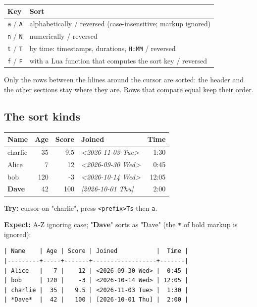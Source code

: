 \begin{center}
\begin{tabular}{ll}
Key & Sort\\
\hline
\texttt{a} / \texttt{A} & alphabetically / reversed (case-insensitive; markup ignored)\\
\texttt{n} / \texttt{N} & numerically / reversed\\
\texttt{t} / \texttt{T} & by time: timestamps, durations, \texttt{H:MM} / reversed\\
\texttt{f} / \texttt{F} & with a Lua function that computes the sort key / reversed\\
\end{tabular}
\end{center}

Only the rows between the hlines around the cursor are sorted: the header
and the other sections stay where they are. Rows that compare equal keep
their order.
\subsection{The sort kinds}
\label{sec:org538b2c8}
\begin{table}[htbp]
\label{tab:org6f725ab}
\centering
\begin{tabular}{lrrlr}
Name & Age & Score & Joined & Time\\
\hline
charlie & 35 & 9.5 & \textit{<2026-11-03 Tue>} & 1:30\\
Alice & 7 & 12 & \textit{<2026-09-30 Wed>} & 0:45\\
bob & 120 & -3 & \textit{<2026-10-14 Wed>} & 12:05\\
\textbf{Dave} & 42 & 100 & \textit{{[}2026-10-01 Thu]} & 2:00\\
\end{tabular}
\end{table}

\textbf{Try:} cursor on "charlie", press \texttt{<prefix>Ts} then \texttt{a}.

\textbf{Expect:} A-Z ignoring case; "\textbf{Dave}" sorts as "Dave" (the \texttt{*} of bold
markup is ignored):
\begin{verbatim}
| Name    | Age | Score | Joined           |  Time |
|---------+-----+-------+------------------+-------|
| Alice   |   7 |    12 | <2026-09-30 Wed> |  0:45 |
| bob     | 120 |    -3 | <2026-10-14 Wed> | 12:05 |
| charlie |  35 |   9.5 | <2026-11-03 Tue> |  1:30 |
| *Dave*  |  42 |   100 | [2026-10-01 Thu] |  2:00 |
\end{verbatim}


